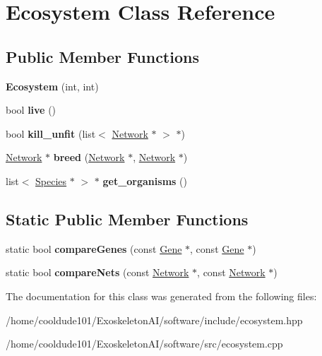 \hypertarget{classEcosystem}{}\section{Ecosystem Class Reference}
\label{classEcosystem}
\subsection*{Public Member Functions}
\begin{DoxyCompactItemize}
\item 
{\bfseries Ecosystem} (int, int)\hypertarget{classEcosystem_aff5b790ce0978932802193547a184534}{}\label{classEcosystem_aff5b790ce0978932802193547a184534}

\item 
bool {\bfseries live} ()\hypertarget{classEcosystem_a96da4123beb93646389fee3400afc7ad}{}\label{classEcosystem_a96da4123beb93646389fee3400afc7ad}

\item 
bool {\bfseries kill\+\_\+unfit} (list$<$ \hyperlink{classNetwork}{Network} $\ast$ $>$ $\ast$)\hypertarget{classEcosystem_a4b70d6252347204eb612c848b9b1aa1a}{}\label{classEcosystem_a4b70d6252347204eb612c848b9b1aa1a}

\item 
\hyperlink{classNetwork}{Network} $\ast$ {\bfseries breed} (\hyperlink{classNetwork}{Network} $\ast$, \hyperlink{classNetwork}{Network} $\ast$)\hypertarget{classEcosystem_a27fcaa68b28e593955e2af6d764d4815}{}\label{classEcosystem_a27fcaa68b28e593955e2af6d764d4815}

\item 
list$<$ \hyperlink{classSpecies}{Species} $\ast$ $>$ $\ast$ {\bfseries get\+\_\+organisms} ()\hypertarget{classEcosystem_a6ec32facf46318b6e25be28414ba9e93}{}\label{classEcosystem_a6ec32facf46318b6e25be28414ba9e93}

\end{DoxyCompactItemize}
\subsection*{Static Public Member Functions}
\begin{DoxyCompactItemize}
\item 
static bool {\bfseries compare\+Genes} (const \hyperlink{classGene}{Gene} $\ast$, const \hyperlink{classGene}{Gene} $\ast$)\hypertarget{classEcosystem_a1559a6ad5604c422bdc377aa6c7b7b81}{}\label{classEcosystem_a1559a6ad5604c422bdc377aa6c7b7b81}

\item 
static bool {\bfseries compare\+Nets} (const \hyperlink{classNetwork}{Network} $\ast$, const \hyperlink{classNetwork}{Network} $\ast$)\hypertarget{classEcosystem_a85ecfac3c569f99b702d23b1214f7f10}{}\label{classEcosystem_a85ecfac3c569f99b702d23b1214f7f10}

\end{DoxyCompactItemize}


The documentation for this class was generated from the following files\+:\begin{DoxyCompactItemize}
\item 
/home/cooldude101/\+Exoskeleton\+A\+I/software/include/ecosystem.\+hpp\item 
/home/cooldude101/\+Exoskeleton\+A\+I/software/src/ecosystem.\+cpp\end{DoxyCompactItemize}

